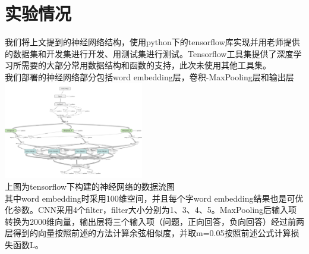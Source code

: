 \documentclass{article}
\begin{document}
\section{实验情况}
我们将上文提到的神经网络结构，使用python下的tensorflow库实现并用老师提供的数据集和开发集进行开发、用测试集进行测试。Tensorflow工具集提供了深度学习所需要的大部分常用数据结构和函数的支持，此次未使用其他工具集。\\

我们部署的神经网络部分包括word embedding层，卷积-MaxPooling层和输出层\\

\includegraphics[height=160]{1.png}\\

上图为tensorflow下构建的神经网络的数据流图\\

其中word embedding时采用100维空间，并且每个字word embedding结果也是可优化参数。CNN采用4个filter，filter大小分别为1、3、4、5。MaxPooling后输入项转换为2000维向量，输出层将三个输入项（问题，正向回答，负向回答）经过前两层得到的向量按照前述的方法计算余弦相似度，并取m=0.05按照前述公式计算损失函数L。\\
\end{document}
